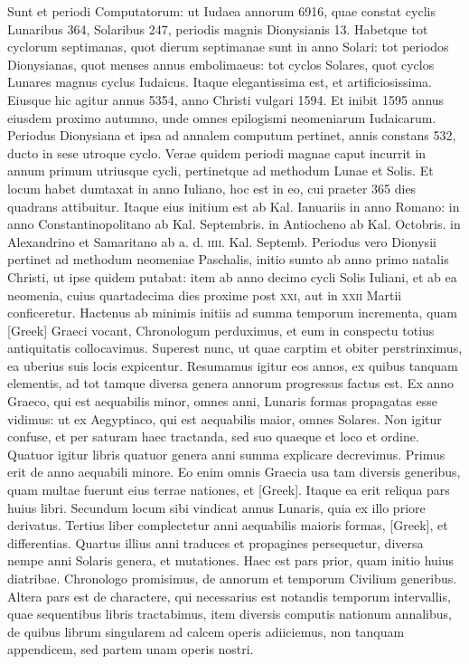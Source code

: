 Sunt et periodi Computatorum: ut Iudaea
annorum 6916, quae constat cyclis Lunaribus 364, Solaribus 247, periodis
magnis Dionysianis 13.
Habetque tot cyclorum septimanas,
quot dierum septimanae sunt in anno Solari: tot periodos Dionysianas,
quot menses annus embolimaeus: tot cyclos Solares, quot cyclos
Lunares magnus cyclus Iudaicus.
Itaque elegantissima est, et artificiosissima.
Eiusque hic agitur annus 5354, anno Christi vulgari 1594.
Et inibit 1595 annus eiusdem proximo autumno, unde omnes epilogismi
neomeniarum Iudaicarum.
Periodus Dionysiana et ipsa ad
annalem computum pertinet, annis constans 532, ducto in sese utroque
cyclo.
Verae quidem periodi magnae caput incurrit in annum
primum utriusque cycli, pertinetque ad methodum Lunae et Solis.
Et
locum habet dumtaxat in anno Iuliano, hoc est in eo, cui praeter 365
dies quadrans attibuitur.
Itaque eius initium est ab Kal. Ianuariis in
anno Romano: in anno Constantinopolitano ab Kal. Septembris. in
Antiocheno ab Kal. Octobris. in Alexandrino et Samaritano ab a. d.
\textsc{iiii}. Kal. Septemb.
Periodus vero Dionysii pertinet ad methodum
neomeniae Paschalis, initio sumto ab anno primo natalis Christi, ut
ipse quidem putabat: item ab anno decimo cycli Solis Iuliani, et ab
ea neomenia, cuius quartadecima dies proxime post
 \textsc{xxi}, aut in \textsc{xxii}
Martii conficeretur.
Hactenus ab minimis initiis ad summa temporum
incrementa, quam \textgreek{[Greek]} Graeci vocant, Chronologum
perduximus, et eum in conspectu totius antiquitatis collocavimus.
Superest nunc, ut quae carptim et obiter perstrinximus, ea uberius
suis locis expicentur.
Resumamus igitur eos annos, ex quibus tanquam
elementis, ad tot tamque diversa genera annorum progressus
factus est.
Ex anno Graeco, qui est aequabilis minor, omnes anni, Lunaris
formas propagatas esse vidimus: ut ex Aegyptiaco, qui est aequabilis
maior, omnes Solares.
Non igitur confuse, et per saturam haec
tractanda, sed suo quaeque et loco et ordine.
Quatuor igitur libris
quatuor genera anni summa explicare decrevimus.
Primus erit de
anno aequabili minore.
Eo enim omnis Graecia usa tam diversis generibus,
quam multae fuerunt eius terrae nationes, et \textgreek{[Greek]}.
Itaque
ea erit reliqua pars huius libri.
Secundum locum sibi vindicat annus
Lunaris, quia ex illo priore derivatus.
Tertius liber complectetur anni
aequabilis maioris formas, \textgreek{[Greek]}, et differentias.
Quartus illius anni
traduces et propagines persequetur, diversa nempe anni Solaris genera,
et mutationes.
Haec est pars prior, quam initio huius diatribae.
Chronologo promisimus, de annorum et temporum Civilium generibus.
Altera pars est de charactere, qui necessarius est notandis temporum
intervallis, quae sequentibus libris tractabimus, item diversis
computis nationum annalibus, de quibus librum singularem ad calcem
operis adiiciemus, non tanquam appendicem, sed partem unam
operis nostri.

